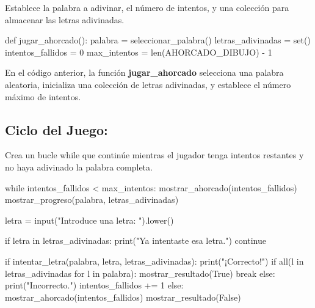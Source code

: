 \documentclass[
  a4paper,
  DIV=11,
  numbers=noendperiod,
  onepage,
  openany]{scrreprt}
\newenvironment{Shaded}{\begin{snugshade}}{\end{snugshade}}
\newcommand{\BuiltInTok}[1]{\textcolor[rgb]{0.00,0.23,0.31}{#1}}
\newcommand{\ControlFlowTok}[1]{\textcolor[rgb]{0.00,0.23,0.31}{#1}}
\newcommand{\DecValTok}[1]{\textcolor[rgb]{0.68,0.00,0.00}{#1}}
\newcommand{\KeywordTok}[1]{\textcolor[rgb]{0.00,0.23,0.31}{#1}}
\newcommand{\NormalTok}[1]{\textcolor[rgb]{0.00,0.23,0.31}{#1}}
\newcommand{\OperatorTok}[1]{\textcolor[rgb]{0.37,0.37,0.37}{#1}}
\newcommand{\StringTok}[1]{\textcolor[rgb]{0.13,0.47,0.30}{#1}}
\newcommand{\VariableTok}[1]{\textcolor[rgb]{0.07,0.07,0.07}{#1}}
\begin{document}
Establece la palabra a adivinar, el número de intentos, y una colección
para almacenar las letras adivinadas.

\begin{Shaded}
\begin{Highlighting}[]
\KeywordTok{def}\NormalTok{ jugar\_ahorcado():}
\NormalTok{    palabra }\OperatorTok{=}\NormalTok{ seleccionar\_palabra()}
\NormalTok{    letras\_adivinadas }\OperatorTok{=} \BuiltInTok{set}\NormalTok{()}
\NormalTok{    intentos\_fallidos }\OperatorTok{=} \DecValTok{0}
\NormalTok{    max\_intentos }\OperatorTok{=} \BuiltInTok{len}\NormalTok{(AHORCADO\_DIBUJO) }\OperatorTok{{-}} \DecValTok{1}
\end{Highlighting}
\end{Shaded}

En el código anterior, la función \textbf{jugar\_ahorcado} selecciona
una palabra aleatoria, inicializa una colección de letras adivinadas, y
establece el número máximo de intentos.

\subsection{Ciclo del Juego:}\label{ciclo-del-juego}

Crea un bucle while que continúe mientras el jugador tenga intentos
restantes y no haya adivinado la palabra completa.

\begin{Shaded}
\begin{Highlighting}[]
    \ControlFlowTok{while}\NormalTok{ intentos\_fallidos }\OperatorTok{\textless{}}\NormalTok{ max\_intentos:}
\NormalTok{        mostrar\_ahorcado(intentos\_fallidos)}
\NormalTok{        mostrar\_progreso(palabra, letras\_adivinadas)}
        
\NormalTok{        letra }\OperatorTok{=} \BuiltInTok{input}\NormalTok{(}\StringTok{"Introduce una letra: "}\NormalTok{).lower()}
        
        \ControlFlowTok{if}\NormalTok{ letra }\KeywordTok{in}\NormalTok{ letras\_adivinadas:}
            \BuiltInTok{print}\NormalTok{(}\StringTok{"Ya intentaste esa letra."}\NormalTok{)}
            \ControlFlowTok{continue}
        
        \ControlFlowTok{if}\NormalTok{ intentar\_letra(palabra, letra, letras\_adivinadas):}
            \BuiltInTok{print}\NormalTok{(}\StringTok{"¡Correcto!"}\NormalTok{)}
            \ControlFlowTok{if} \BuiltInTok{all}\NormalTok{(l }\KeywordTok{in}\NormalTok{ letras\_adivinadas }\ControlFlowTok{for}\NormalTok{ l }\KeywordTok{in}\NormalTok{ palabra):}
\NormalTok{                mostrar\_resultado(}\VariableTok{True}\NormalTok{)}
                \ControlFlowTok{break}
        \ControlFlowTok{else}\NormalTok{:}
            \BuiltInTok{print}\NormalTok{(}\StringTok{"Incorrecto."}\NormalTok{)}
\NormalTok{            intentos\_fallidos }\OperatorTok{+=} \DecValTok{1}
    \ControlFlowTok{else}\NormalTok{:}
\NormalTok{        mostrar\_ahorcado(intentos\_fallidos)}
\NormalTok{        mostrar\_resultado(}\VariableTok{False}\NormalTok{)}
\end{Highlighting}
\end{Shaded}
\end{document}
